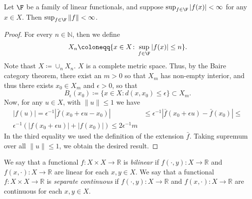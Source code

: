 \begin{theorem}
Let $\F$ be a family of linear functionals, and suppose $\sup_{f \in \F} |f(x)| < \infty$ for any $x \in X$. Then $\sup_{f \in \F} \| f\| < \infty$.
\label{thm:boundedness}
\end{theorem}
\begin{proof}
For every $n \in \mathbb{N}$, then we define
\[
X_n \coloneqq \{ x \in X \colon \sup_{f \in \F} |f(x)| \leq n \}.
\]
Note thast $X \coloneqq \cup_n X_n$.
$X$ is a complete metric space. Thus, by the Baire category theorem, there exist an $m>0$ so that $X_m$ has non-empty interior, and thus there exists $x_0 \in X_m$ and $\epsilon>0$, so that
\[
B_{\epsilon}(x_0) \coloneqq \{ x\in X \colon d(x,x_0) \leq \epsilon \} \subset X_m.
\]
Now, for any $u \in X$, with $\| u \| \leq 1$ we have
\begin{align*}
|f(u)|=  \epsilon^{-1} |\bar{f}(x_0 + \epsilon u - x_0)| & \leq \epsilon^{-1}|\bar{f}(x_0 + \epsilon u) - \bar{f}(x_0)| \leq \\
\epsilon^{-1}(|f(x_0 + \epsilon u)| + |f(x_0)|) \leq 2\epsilon^{-1}m
\end{align*}
In the third equality we used the definition of the extension $\bar{f}$.
Taking supremum over all $\| u \| \leq 1$, we obtain the desired result.
\end{proof}

We say that a functional $f \colon X \times X \to \mathbb{R}$ is \emph{bilinear} if $f(\cdot,y) \colon X \to \mathbb{R}$ and $f(x,\cdot) \colon X \to \mathbb{R}$ are linear for each $x,y \in X$.
We say that a functional $f \colon X \times X \to \mathbb{R}$ is \emph{separate continuous} if $f(\cdot,y) \colon X \to \mathbb{R}$ and $f(x,\cdot) \colon X \to \mathbb{R}$ are continuous for each $x,y \in X$.

